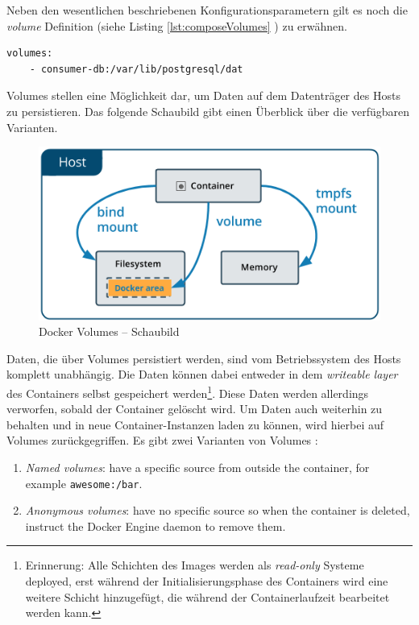 Neben den wesentlichen beschriebenen Konfigurationsparametern gilt es noch die \emph{volume} Definition (siehe Listing \ref{lst:composeVolumes} ) zu erwähnen. 


\begin{lstlisting}[style=bashStyle,caption={Docker Compose - Volume Definition},label=lst:composeVolumes]
  volumes:
    - consumer-db:/var/lib/postgresql/dat
\end{lstlisting}

Volumes stellen eine Möglichkeit dar, um Daten auf dem Datenträger des Hosts zu persistieren. Das folgende Schaubild gibt einen Überblick über die verfügbaren Varianten.

\begin{figure}[ht!]
	\centering
	\includegraphics[width=.6\linewidth]{kapitel/problemloesung/implementierung/_img/types-of-mounts-volume}
	\caption[Docker Volumes -- Schaubild]{Docker Volumes -- Schaubild \cite[Kapitel~/storage/volumes/]{docker-doc}}
	\label{fig:dockerImage}
\end{figure}

Daten, die über Volumes persistiert werden, sind vom Betriebssystem des Hosts komplett unabhängig. Die Daten können dabei entweder in dem \emph{writeable layer} des Containers selbst gespeichert werden\footnote{Erinnerung: Alle Schichten des Images werden als \emph{read-only} Systeme deployed, erst während der Initialisierungsphase des Containers wird eine weitere Schicht hinzugefügt, die während der Containerlaufzeit bearbeitet werden kann.}. Diese Daten werden allerdings verworfen, sobald der Container gelöscht wird. Um Daten auch weiterhin zu behalten und in neue Container-Instanzen laden zu können, wird hierbei auf Volumes zurückgegriffen. Es gibt zwei Varianten von Volumes \cite[Kapitel~/storage/volumes]{docker-doc}: 

\begin{enumerate}
  \item \emph{Named volumes}: have a specific source from outside the container, for example \verb+awesome:/bar+.
  \item \emph{Anonymous volumes}: have no specific source so when the container is deleted, instruct the Docker Engine daemon to remove them.
\end{enumerate}

